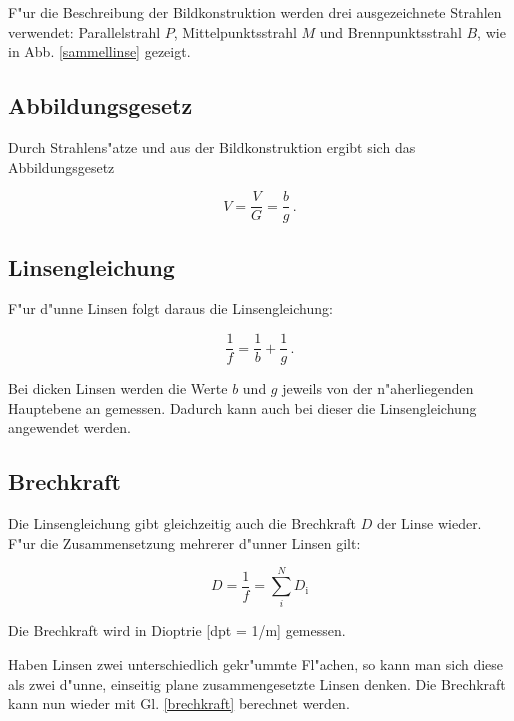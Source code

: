 	F"ur die Beschreibung der Bildkonstruktion werden drei ausgezeichnete Strahlen verwendet:
	Parallelstrahl $P$, Mittelpunktsstrahl $M$ und Brennpunktsstrahl $B$, wie in Abb. \eqref{sammellinse} gezeigt.

	\subsection{Abbildungsgesetz} %
	\label{sub:abbildungsgesetz}
	
	Durch Strahlens"atze und aus der Bildkonstruktion ergibt sich das Abbildungsgesetz

	\begin{equation}
		\label{abbildungsmassstab}
		V = \frac{V}{G} = \frac{b}{g}\, .
	\end{equation}

	\subsection{Linsengleichung} %
	\label{sub:linsengleichung}
	
	F"ur d"unne Linsen folgt daraus die Linsengleichung:

	\begin{equation}
		\label{linsengleichung}
		\frac{1}{f} = \frac{1}{b} + \frac{1}{g}\, .
	\end{equation}

	Bei dicken Linsen werden die Werte $b$ und $g$ jeweils von der n"aherliegenden Hauptebene an gemessen. Dadurch kann auch bei dieser die Linsengleichung angewendet werden.

	\subsection{Brechkraft} %
	\label{sub:brechkraft}
	
	Die Linsengleichung gibt gleichzeitig auch die Brechkraft $D$ der Linse wieder. F"ur die Zusammensetzung mehrerer d"unner Linsen gilt:

	\begin{equation}
		D = \frac{1}{f} = \sum_i^N D_\mathrm{i} \label{brechkraft}
	\end{equation}

	Die Brechkraft wird in Dioptrie [dpt = 1/m] gemessen.

	Haben Linsen zwei unterschiedlich gekr"ummte Fl"achen, so kann man sich diese als zwei d"unne, einseitig plane zusammengesetzte Linsen denken.
	Die Brechkraft kann nun wieder mit Gl. \eqref{brechkraft} berechnet werden.

